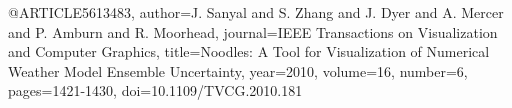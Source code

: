 @ARTICLE{5613483,
  author={J. {Sanyal} and S. {Zhang} and J. {Dyer} and A. {Mercer} and P. {Amburn} and R. {Moorhead}},
  journal={IEEE Transactions on Visualization and Computer Graphics}, 
  title={Noodles: A Tool for Visualization of Numerical Weather Model Ensemble Uncertainty}, 
  year={2010},
  volume={16},
  number={6},
  pages={1421-1430},
  doi={10.1109/TVCG.2010.181}}
